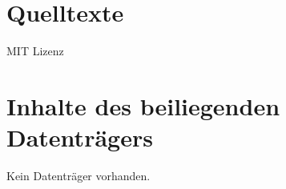 \label{chap:anhang}


\section{Quelltexte}
\label{sec:quelltexte}


\begin{code}
  
  \caption{MIT Lizenz}
  \label{lst:mitlizenz}
\end{code}


\section{Inhalte des beiliegenden Datenträgers}
\label{sec:quelltexte}
Kein Datenträger vorhanden.
